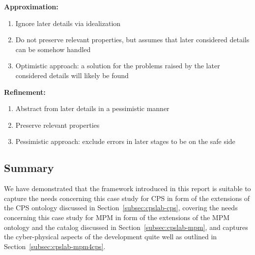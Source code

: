{{\bf Approximation:}

\begin{enumerate}
    \item Ignore later details via idealization
\item Do not preserve relevant properties, but assumes that later considered details can be somehow handled
\item Optimistic approach: a solution for the problems raised by the later considered details will likely be found
    
\end{enumerate}

{\bf Refinement:}

\begin{enumerate}
    \item Abstract from later details in a pessimistic manner
\item Preserve relevant properties
\item Pessimistic approach: 
exclude errors in later stages to be on the safe side
\end{enumerate}


}

\subsection{Summary}
%
We have demonstrated that the framework introduced in this report is 
%
suitable to capture the needs concerning this case study for CPS in form of the extensions of the CPS ontology discussed in  Section~\ref{subsec:cpslab-cps},
%
covering the needs concerning this case study for MPM in form of the extensions of the MPM ontology and the catalog discussed in  Section~\ref{subsec:cpslab-mpm}, and
%
captures the cyber-physical aspects of the development quite well as outlined in  Section~\ref{subsec:cpslab-mpm4cps}.

